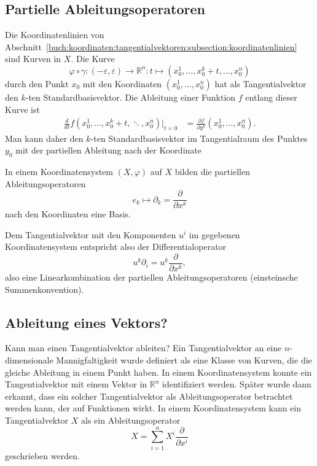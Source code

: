 %
%
\subsection{Partielle Ableitungsoperatoren}
Die Koordinatenlinien von
Abschnitt~\ref{buch:koordinaten:tangentialvektoren:subsection:koordinatenlinien}
sind Kurven in $X$.
Die Kurve
\[
\varphi\circ\gamma
\colon
(-\varepsilon,\varepsilon)
\to
\mathbb{R}^n
:
t\mapsto (x_0^1,\dots,x_0^k+t,\dots,x_0^n)
\]
durch den Punkt $x_0$ mit den Koordinaten $(x_0^1,\dots,x_0^n)$
hat als Tangentialvektor den $k$-ten Standardbasisvektor.
Die Ableitung einer Funktion $f$ entlang dieser Kurve ist
\begin{align*}
\frac{d}{dt}
f(x_0^1,\dots,x_0^k+t,\ddots,x_0^n)
\bigg|_{t=0}
&=
\frac{\partial f}{\partial y^k}(x_0^1,\dots,x_0^n).
\end{align*}
Man kann daher den $k$-ten Standardbasisvektor im Tangentialraum
des Punktes $y_0$ mit der partiellen Ableitung nach der Koordinate

\begin{satz}
In einem Koordinatensystem $(X,\varphi)$ auf $X$ bilden 
die partiellen Ableitungsoperatoren 
\[
e_k
\mapsto
\partial_k = \frac{\partial}{\partial x^k}
\]
nach den Koordinaten eine Basis.
\end{satz}

Dem Tangentialvektor mit den Komponenten $u^i$ im gegebenen
Koordinatensystem entspricht also der Differentialoperator
\[
u^k\partial_i = u^k\frac{\partial}{\partial x^k},
\]
also eine Linearkombination der partiellen Ableitungsoperatoren
(einsteinsche Summenkonvention).

%
%
\subsection{Ableitung eines Vektors?
\label{buch:koordinaten:diffop:subsection:vektorableitung}}
Kann man einen Tangentialvektor ableiten?
Ein Tangentialvektor an eine $n$-dimensionale Mannigfaltigkeit wurde
definiert als eine Klasse von Kurven, die die gleiche Ableitung in
einem Punkt haben.
In einem Koordinatensystem konnte ein Tangentialvektor mit einem
Vektor in $\mathbb{R}^n$ identifiziert werden.
Später wurde dann erkannt, dass ein solcher Tangentialvektor als
Ableitungsoperator betrachtet werden kann, der auf Funktionen
wirkt.
In einem Koordinatensystem kann ein Tangentialvektor $X$ als
ein Ableitungsoperator
\[
X
=
\sum_{i=1}^n
X^i \frac{\partial}{\partial x^i}
\]
geschrieben werden.

